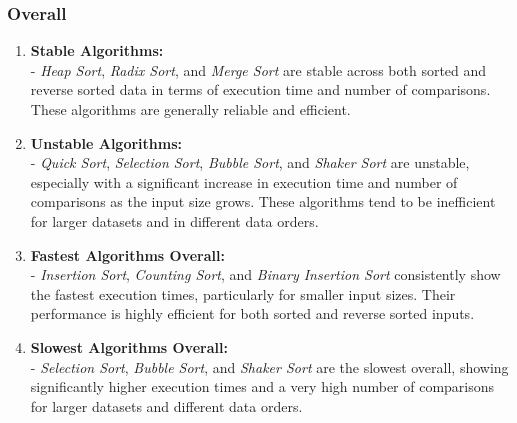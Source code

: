 \subsubsection{Overall}
\begin{enumerate}
    \item \textbf{Stable Algorithms:} \\
- \textit{Heap Sort}, \textit{Radix Sort}, and \textit{Merge Sort} are stable across both sorted and reverse sorted data in terms of execution time and number of comparisons. These algorithms are generally reliable and efficient.

    \item \textbf{Unstable Algorithms:} \\
- \textit{Quick Sort}, \textit{Selection Sort}, \textit{Bubble Sort}, and \textit{Shaker Sort} are unstable, especially with a significant increase in execution time and number of comparisons as the input size grows. These algorithms tend to be inefficient for larger datasets and in different data orders.

    \item \textbf{Fastest Algorithms Overall:} \\
- \textit{Insertion Sort}, \textit{Counting Sort}, and \textit{Binary Insertion Sort} consistently show the fastest execution times, particularly for smaller input sizes. Their performance is highly efficient for both sorted and reverse sorted inputs.

    \item \textbf{Slowest Algorithms Overall:} \\
- \textit{Selection Sort}, \textit{Bubble Sort}, and \textit{Shaker Sort} are the slowest overall, showing significantly higher execution times and a very high number of comparisons for larger datasets and different data orders.
\end{enumerate}
